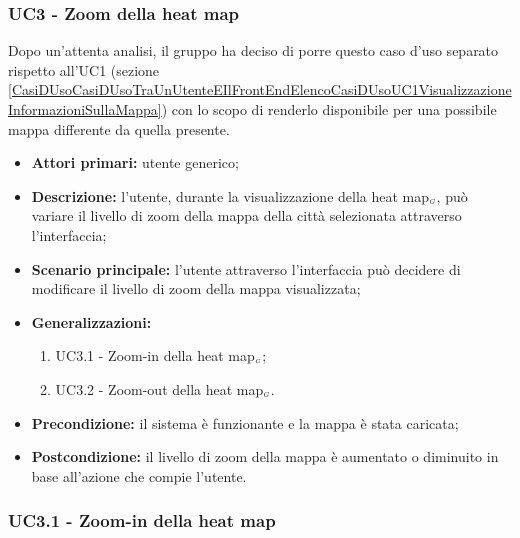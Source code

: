 \subsubsection{UC3 - Zoom della heat map}\label{CasiDUsoCasiDUsoTraUnUtenteEIlFrontEndElencoCasiDUsoUC3ZoomDellaHeatMap}

Dopo un'attenta analisi, il gruppo ha deciso di porre questo caso d'uso separato rispetto all'UC1 (sezione \ref{CasiDUsoCasiDUsoTraUnUtenteEIlFrontEndElencoCasiDUsoUC1VisualizzazioneInformazioniSullaMappa}) con lo scopo di renderlo disponibile per una possibile mappa differente da quella presente.



\begin{itemize}
	\item \textbf{Attori primari:} utente generico;
	\item \textbf{Descrizione:} l’utente, durante la visualizzazione della heat map$_{\scaleto{G}{3pt}}$, può variare il livello di zoom della mappa della città selezionata attraverso l'interfaccia;
	\item \textbf{Scenario principale:} l’utente attraverso l'interfaccia può decidere di modificare il livello di zoom della mappa visualizzata;
	\item \textbf{Generalizzazioni:}\begin{enumerate}
		\item UC3.1 - Zoom-in della heat map$_{\scaleto{G}{3pt}}$;
		\item UC3.2 - Zoom-out della heat map$_{\scaleto{G}{3pt}}$.
	\end{enumerate}
	\item \textbf{Precondizione:} il sistema è funzionante e la mappa è stata caricata;
	\item \textbf{Postcondizione:} il livello di zoom della mappa è aumentato o diminuito in base all'azione che compie l'utente.
\end{itemize}

\subsubsection{UC3.1 - Zoom-in della heat map}\label{CasiDUsoCasiDUsoTraUnUtenteEIlFrontEndElencoCasiDUsoUC31ZoomInDellaHeatMap}

